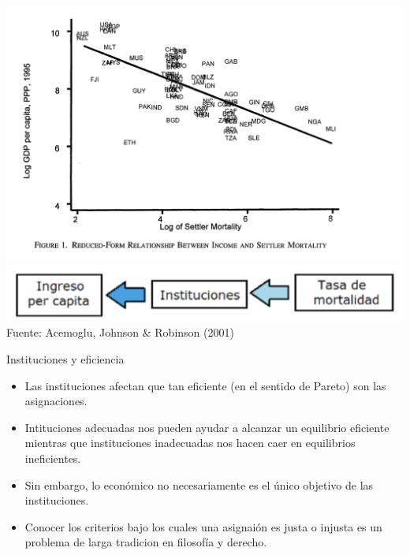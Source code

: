 \documentclass{beamer}
\begin{document}
\begin{frame}
    \centering
    \includegraphics[scale=0.35]{../Figures/M9.4.png} \vspace{2mm}
    \includegraphics[scale=0.35]{../Figures/M9.3.png} \\ \vspace{2mm}
    \small Fuente: Acemoglu, Johnson \& Robinson (2001)
\end{frame}

\begin{frame}{Instituciones y eficiencia}
    \begin{itemize}
        \item Las instituciones afectan que tan eficiente (en el sentido de Pareto) son las asignaciones.
        \item Intituciones adecuadas nos pueden ayudar a alcanzar un equilibrio eficiente mientras que instituciones inadecuadas nos hacen caer en equilibrios ineficientes.
        \item Sin embargo, lo económico no necesariamente es el único objetivo de las instituciones.
        \item Conocer los criterios bajo los cuales una asignaión es justa o injusta es un problema de larga tradicion en filosofía y derecho.
    \end{itemize}
\end{frame}
\end{document}
